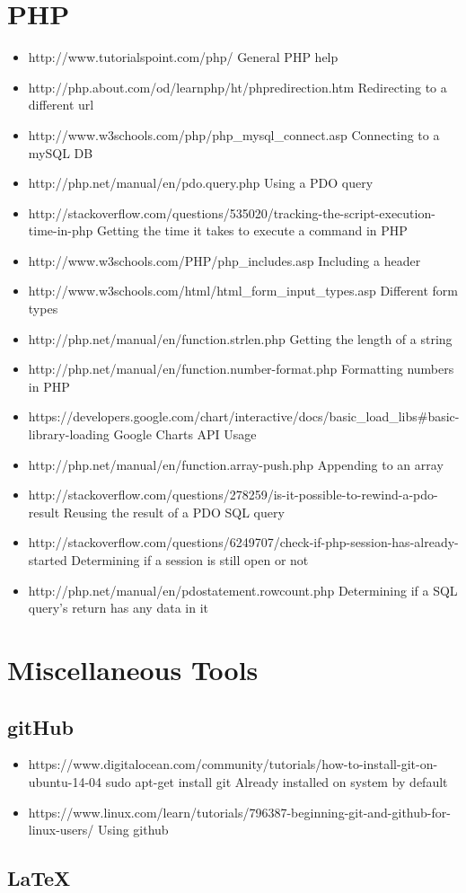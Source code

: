 \documentclass[12pt]{article}
\begin{document}
\section{PHP}
	\begin{itemize}
		\item http://www.tutorialspoint.com/php/
		\subitem General PHP help
		\item http://php.about.com/od/learnphp/ht/phpredirection.htm
		\subitem Redirecting to a different url
		\item http://www.w3schools.com/php/php\_mysql\_connect.asp
		\subitem Connecting to a mySQL DB
		\item http://php.net/manual/en/pdo.query.php
		\subitem Using a PDO query
		\item http://stackoverflow.com/questions/535020/tracking-the-script-execution-time-in-php
		\subitem Getting the time it takes to execute a command in PHP
		\item http://www.w3schools.com/PHP/php\_includes.asp
		\subitem Including a header
		\item http://www.w3schools.com/html/html\_form\_input\_types.asp
		\subitem Different form types
		\item http://php.net/manual/en/function.strlen.php
		\subitem Getting the length of a string
		\item http://php.net/manual/en/function.number-format.php
		\subitem Formatting numbers in PHP
		\item https://developers.google.com/chart/interactive/docs/basic_load_libs#basic-library-loading
		\subitem Google Charts API Usage
		\item http://php.net/manual/en/function.array-push.php
		\subitem Appending to an array
		\item http://stackoverflow.com/questions/278259/is-it-possible-to-rewind-a-pdo-result
		\subitem Reusing the result of a PDO SQL query
		\item http://stackoverflow.com/questions/6249707/check-if-php-session-has-already-started
		\subitem Determining if a session is still open or not
		\item http://php.net/manual/en/pdostatement.rowcount.php
		\subitem Determining if a SQL query's return has any data in it
	\end{itemize}
\section{Miscellaneous Tools}
	\subsection{gitHub}
	\begin{itemize}
		\item https://www.digitalocean.com/community/tutorials/how-to-install-git-on-ubuntu-14-04
		\subitem sudo apt-get install git
		\subitem Already installed on system by default
		\item https://www.linux.com/learn/tutorials/796387-beginning-git-and-github-for-linux-users/
			\subitem Using github
	\end{itemize}
	\subsection{LaTeX}
\end{document}
